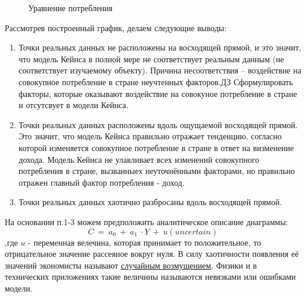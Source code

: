 \documentclass[12pt,a4paper]{article}
\begin{document}
\begin{figure}[H]
\begin{center}
\end{center}
\caption{Уравнение потребления}
\end{figure}

Рассмотрев построенный график, делаем следующие выводы:
\begin{enumerate}
\item Точки реальных данных не расположены на восходящей прямой, и это значит, что модель Кейнса в полной мере не соответствует реальным данным (не соответствует изучаемому объекту). Причина несоответствия -- воздействие на совокупное потребление в стране неучтенных факторов.$\displaystyle \boxed{\text{ДЗ}}$ Сформулировать факторы, которые оказывают воздействие на совокуное потребление в стране и отсутсвует в модели Кейнса. 
\item Точки реальных данных расположены вдоль ощущаемой восходящей прямой. Это значит, что модель Кейнса правильно отражает тенденцию, согласно которой изменяется совокупное потребление в стране в ответ на визменение дохода. Модель Кейнса не улавливает всех изменений совокупного потребления в стране, вызванныех неуточнёнными факторами, но правильно отражен главный фактор потребления - доход.
\item Точки реальных данных хаотично разбросаны вдоль восходящей прямой.
\end{enumerate}

	На основании п.1-3 можем предположить аналитическое описание диаграммы:
\begin{equation}
C\ =\ a_{0} \ +\ a_{1} \ \cdot Y\ +\ u( uncertain)
\end{equation}
,где $\displaystyle u$ - переменная велечина, которая принимает то положительное, то отрицательное значение рассеяное вокруг нуля. В силу хаотичности появления её значений экономисты называют \underline{случайным возмущением}. Физики и в технических приложениях такие величины называются невязками или ошибками модели.
\end{document}
